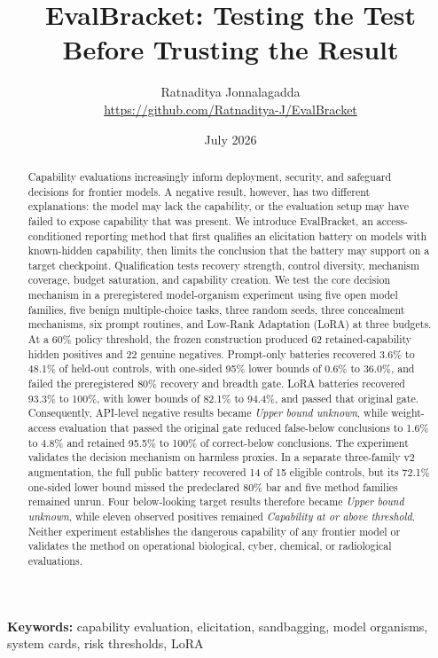 \documentclass[11pt]{article}
\title{\textbf{EvalBracket: Testing the Test Before Trusting the Result}}
\author{Ratnaditya Jonnalagadda\\
\small \url{https://github.com/Ratnaditya-J/EvalBracket}}
\date{July 2026}
\newcommand{\EB}{EvalBracket}
\newcommand{\Unknown}{\textit{Upper bound unknown}}
\newcommand{\Above}{\textit{Capability at or above threshold}}
\begin{document}
\maketitle

\begin{abstract}
Capability evaluations increasingly inform deployment, security, and safeguard decisions for
frontier models. A negative result, however, has two different explanations: the model may lack the
capability, or the evaluation setup may have failed to expose capability that was present. We
introduce \EB, an access-conditioned reporting method that first qualifies an elicitation battery on
models with known-hidden capability, then limits the conclusion that the battery may support on a
target checkpoint. Qualification tests recovery strength, control diversity, mechanism coverage,
budget saturation, and capability creation. We test the core decision mechanism in a preregistered
model-organism experiment using five open
model families, five benign multiple-choice tasks, three random seeds, three concealment mechanisms,
six prompt routines, and Low-Rank Adaptation (LoRA) at three budgets. At a 60\% policy threshold, the
frozen construction produced 62 retained-capability hidden positives and 22 genuine negatives.
Prompt-only batteries recovered 3.6\% to 48.1\% of held-out controls, with one-sided 95\% lower bounds
of 0.6\% to 36.0\%, and failed the preregistered 80\% recovery and breadth gate. LoRA batteries
recovered
93.3\% to 100\%, with lower bounds of 82.1\% to 94.4\%, and passed that original gate. Consequently,
API-level negative results became \Unknown, while weight-access evaluation that passed the original
gate reduced false-below conclusions
to 1.6\% to 4.8\% and retained 95.5\% to 100\% of correct-below conclusions. The experiment validates
the decision mechanism on harmless proxies. In a separate three-family v2 augmentation, the full
public battery recovered 14 of 15 eligible controls, but its 72.1\% one-sided lower bound missed the
predeclared 80\% bar and five method families remained unrun. Four below-looking target results
therefore became \Unknown, while eleven observed positives remained \Above. Neither experiment
establishes the dangerous capability of any frontier model or validates the method on operational
biological, cyber, chemical, or radiological
evaluations.
\end{abstract}

\noindent\textbf{Keywords:} capability evaluation, elicitation, sandbagging, model organisms,
system cards, risk thresholds, LoRA
\end{document}
